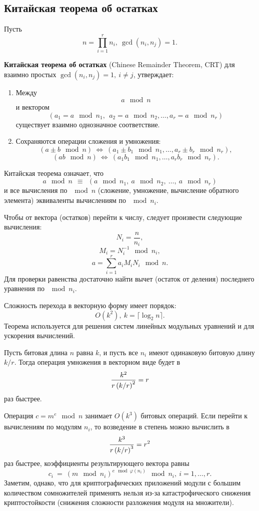 \subsection{Китайская теорема об остатках}

Пусть
    \[ n = \prod\limits_{i=1}^{r} n_i, ~ \gcd(n_i, n_j) = 1. \]

 \textbf{Китайская теорема об остатках} (Chinese Remainder Theorem, CRT) для взаимно простых $\gcd(n_i,n_j) = 1, ~ i \neq j$, утверждает:
\begin{enumerate}
    \item Между
        \[ a \mod n \]
        и вектором
        \[ (a_1 = a \mod n_1, ~~ a_2 = a \mod n_2,  \dots,  a_r = a \mod n_r) \]
        существует взаимно однозначное соответствие.
    \item Сохраняются операции сложения и умножения:
        \[ (a \pm b \mod n) ~\Leftrightarrow~ (a_1 \pm b_1 \mod n_1,  \dots,  a_r \pm b_r \mod n_r), \]
        \[ (a b \mod n) ~\Leftrightarrow~ (a_1 b_1 \mod n_1,  \dots,  a_r b_r \mod n_r). \]
\end{enumerate}

Китайская теорема означает, что
    \[ a \mod n ~~\equiv~~ (a \mod n_1, ~ a \mod n_2, ~ \dots, ~ a \mod n_r) \]
и все вычисления по $\mod n$ (сложение, умножение, вычисление обратного элемента) эквиваленты вычислениям по $\mod n_i$.

Чтобы от вектора (остатков) перейти к числу, следует произвести следующие вычисления:
        \[ N_i = \frac{n}{n_i}, \]
        \[ M_i = N_i^{-1} \mod n_i, \]
        \[ a = \sum\limits_{i=1}^{r} a_i M_i N_i \mod n. \]
        Для проверки равенства достаточно найти вычет (остаток от деления) последнего уравнения по $\mod n_i$.

        Сложность перехода в векторную форму имеет порядок:
        \[ O(k^2), ~ k = \lceil \log_2 n \rceil. \]
Теорема используется для решения систем линейных модульных уравнений и для ускорения вычислений.

Пусть битовая длина $n$ равна $k$, и пусть все $n_i$ имеют одинаковую битовую длину $k / r$. Тогда операция умножения в векторном виде будет в
    \[ \frac{k^2}{r \left( k \middle/ r \right)^2 } = r \]
раз быстрее.

Операция $c = m^e \mod n$ занимает $O(k^3)$ битовых операций. Если перейти к вычислениям по модулям $n_i$, то возведение в степень можно вычислить в
    \[ \frac{k^3}{r \left( k \middle/ r \right)^3 } = r^2 \]
раз быстрее, коэффициенты результирующего вектора равны
    \[ c_i ~=~ \left( m \mod n_i \right)^{e \mod \varphi(n_i)} \mod n_i, ~ i = 1, \dots, r. \]
Заметим, однако, что для криптографических приложений модули с большим количеством сомножителей применять нельзя из-за катастрофического снижения криптостойкости (снижения сложности разложения модуля на множители).


